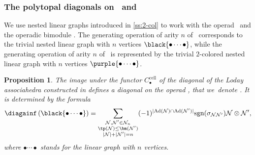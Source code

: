 \documentclass[JEP,XML,SOM,NoFloatCountersInSection,Unicode,published]{cedram}
\theoremstyle{definition}
\theoremstyle{plain}
\newtheorem{proposition}[definition]{Proposition}
\begin{document}
\subsubsection{The polytopal diagonals on \Ainf\ and \Minf}
\label{ss:diagonals}

We use nested linear graphs introduced in \cref{ss:2-col} to work with the operad \Ainf\ and the operadic bimodule \Minf. The generating operation of arity $n$ of \Ainf\ corresponds to the trivial nested linear graph with $n$ vertices $\black{ \bullet \cdots \bullet }$, while the generating operation of arity $n$ of \Minf\ is represented by the trivial $2$-colored nested linear graph with $n$ vertices $\purple{\bullet \cdots \bullet}$.

\begin{proposition}
\label{prop:diagonal-polytopale-a-infini}
The image under the functor $C_\bullet^{\mathrm{cell}}$ of the diagonal of the Loday associahedra constructed in \cite{MTTV19} defines a diagonal on the operad \Ainf, that we~denote \diagainf. It is determined by the formula
\[
\diagainf \left(\black{ \bullet \cdots \bullet } \right) =
\sum_{\substack{
\mathcal{N},\mathcal{N}' \in \mathcal{N}_n \\
\tp(\mathcal{N}) \leq \bm(\mathcal{N'}) \\
|\mathcal{N}|+|\mathcal{N}'|=n
}}
(-1)^{|\mathrm{Ad}(\mathcal{N})\cap \mathrm{Ad}(\mathcal{N}')|}\mathrm{sgn}(\sigma_{\mathcal{N}\mathcal{N}'})\mathcal{N} \otimes \mathcal{N}',
\]
where $\bullet \cdots \bullet$ stands for the linear graph with $n$ vertices.
\end{proposition}
\end{document}
